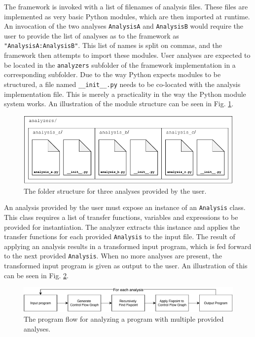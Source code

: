 \newpar The framework is invoked with a list of filenames of analysis files. These files are implemented as very basic Python modules, which are then imported at runtime. An invocation of the two analyses \texttt{AnalysisA} and \texttt{AnalysisB} would require the user to provide the list of analyses as to the framework as \texttt{"AnalysisA:AnalysisB"}. This list of names is split on commas, and the framework then attempts to import these modules. 
User analyses are expected to be located in the \texttt{analyzers} subfolder of the framework implementation in a corresponding subfolder. Due to the way Python expects modules to be structured, a file named \texttt{\_\_init\_\_.py} needs to be co-located with the analysis implementation file. This is merely a practicality in the way the Python module system works. An illustration of the module structure can be seen in Fig. \ref{fig:modulestructure}.

\begin{figure}[H]
    \centering
    \includegraphics{implementation/figures/folderstructure}
    \caption{The folder structure for three analyses provided by the user.}
    \label{fig:modulestructure}
\end{figure}

\newpar An analysis provided by the user must expose an instance of an \texttt{Analysis} class. This class requires a list of transfer functions, variables and expressions to be provided for instantiation. The analyzer extracts this instance and applies the transfer functions for each provided \texttt{Analysis} to the input file. The result of applying an analysis results in a transformed input program, which is fed forward to the next provided \texttt{Analysis}. When no more analyses are present, the transformed input program is given as output to the user. An illustration of this can be seen in Fig. \ref{fig:programflow}.

\begin{figure}[H]
    \centering
    \includegraphics[width=\textwidth]{implementation/figures/programflow}
    \caption{The program flow for analyzing a program with multiple provided analyses.}
    \label{fig:programflow}
\end{figure}


